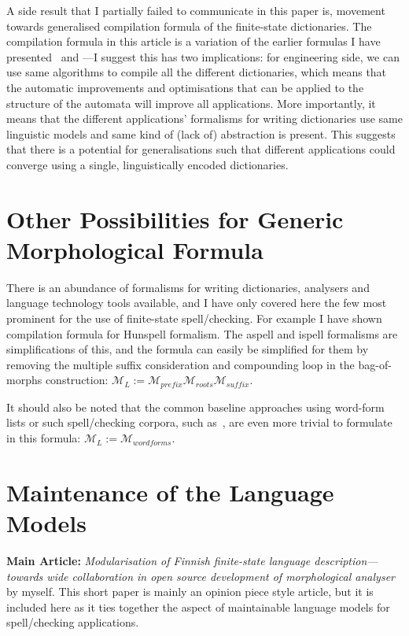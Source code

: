 \documentclass[officiallayout]{unihelcompling}
\begin{document}
A side result that I partially failed to communicate in this paper is, movement
towards generalised compilation formula of the finite-state dictionaries. The
compilation formula in this article is a variation of the earlier formulas I
have presented~\citep{linden2009hfst} and ---I
suggest this has two implications: for engineering side, we can use same
algorithms to compile all the different dictionaries, which means that the
automatic improvements and optimisations that can be applied to the structure
of the automata will improve all applications. More importantly, it means that
the different applications' formalisms for writing dictionaries use same
linguistic models and same kind of (lack of) abstraction is present. This
suggests that there is a potential for generalisations such that different
applications could converge using a single, linguistically encoded
dictionaries.

\section{Other Possibilities for Generic Morphological Formula}
\label{sec:other-lms}

There is an abundance of formalisms for writing dictionaries, analysers and
language technology tools available, and I have only covered here the few most
prominent for the use of finite-state spell\-/checking. For example I have shown
compilation formula for Hunspell formalism. The aspell and ispell formalisms
are simplifications of this, and the formula can easily be simplified for them
by removing the multiple suffix consideration and compounding loop in the
bag-of-morphs construction: $\mathcal{M}_L := \mathcal{M}_{prefix}
\mathcal{M}_{roots} \mathcal{M}_{suffix}$.

It should also be noted that the common baseline approaches using word-form
lists or such spell\-/checking corpora, such as~\citet{norvig2010howto}, are even
more trivial to formulate in this formula: $\mathcal{M}_L :=
\mathcal{M}_{wordforms}$.

\section{Maintenance of the Language Models}
\label{sec:maintenance}

\textbf{Main Article:} \emph{Modularisation of Finnish finite-state language 
description—towards wide collaboration in open source development of
morphological analyser} by myself. This short paper is mainly an opinion
piece style article, but it is included here as it ties together the
aspect of maintainable language models for spell\-/checking applications.
\end{document}
